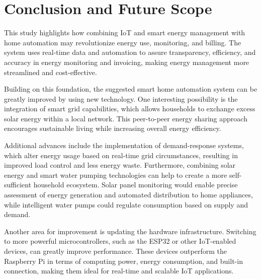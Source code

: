 \documentclass[a4paper,12pt]{report}
\begin{document}
 \chapter{Conclusion and Future Scope}

This study highlights how combining IoT and smart energy management with home automation may revolutionize energy use, monitoring, and billing.  The system uses real-time data and automation to assure transparency, efficiency, and accuracy in energy monitoring and invoicing, making energy management more streamlined and cost-effective.
 
Building on this foundation, the suggested smart home automation system can be greatly improved by using new technology.  One interesting possibility is the integration of smart grid capabilities, which allows households to exchange excess solar energy within a local network.  This peer-to-peer energy sharing approach encourages sustainable living while increasing overall energy efficiency.
 
Additional advances include the implementation of demand-response systems, which alter energy usage based on real-time grid circumstances, resulting in improved load control and less energy waste.  Furthermore, combining solar energy and smart water pumping technologies can help to create a more self-sufficient household ecosystem.  Solar panel monitoring would enable precise assessment of energy generation and automated distribution to home appliances, while intelligent water pumps could regulate consumption based on supply and demand.
 
Another area for improvement is updating the hardware infrastructure.  Switching to more powerful microcontrollers, such as the ESP32 or other IoT-enabled devices, can greatly improve performance.  These devices outperform the Raspberry Pi in terms of computing power, energy consumption, and built-in connection, making them ideal for real-time and scalable IoT applications.
 
 
 


\newpage
\renewcommand{\bibname}{References}



\end{document}
